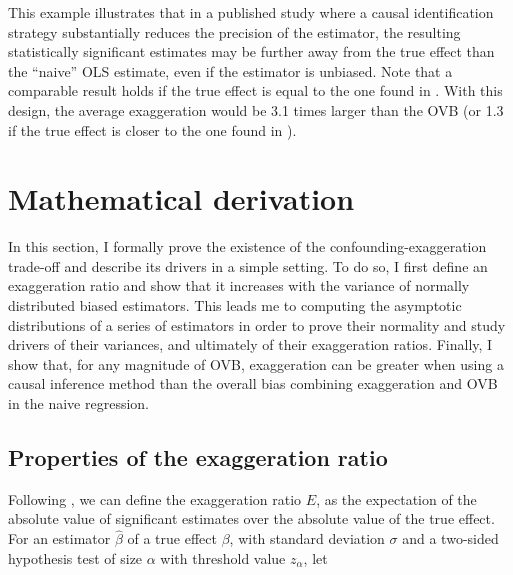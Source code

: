 \documentclass[usletter, 12pt]{article}
\begin{document}
		This example illustrates that in a published study where a causal identification strategy substantially reduces the precision of the estimator, the resulting statistically significant estimates may be further away from the true effect than the ``naive'' OLS estimate, even if the estimator is unbiased. Note that a comparable result holds if the true effect is equal to the one found in \cite{deryugina_mortality_2019}. With this design, the average exaggeration would be 3.1 times larger than the OVB (or 1.3 if the true effect is closer to the one found in \cite{deryugina_mortality_2019}).




	
	\section{Mathematical derivation} \label{maths}
						
		In this section, I formally prove the existence of the confounding-exaggeration trade-off  and describe its drivers in a simple setting.%
		To do so, I first define an exaggeration ratio  and show that it increases with the variance of normally distributed biased estimators. This leads me to computing the asymptotic distributions of a series of estimators in order to prove their normality and study drivers of their variances, and ultimately of their exaggeration ratios. Finally, I show that, for any magnitude of OVB, exaggeration can be greater when using a causal inference method than the overall bias combining exaggeration and OVB in the naive regression.
		
		
		\subsection{Properties of the exaggeration ratio}\label{general_exagg}
		
			Following  \cite{gelman_beyond_2014}, we can define the exaggeration ratio $E$, as the expectation of the absolute value of significant estimates over the absolute value of the true effect. For an estimator $\hat{\beta}$ of a true effect $\beta$, with standard deviation $\sigma$ and a two-sided hypothesis test of size $\alpha$ with threshold value $z_{\alpha}$, let
			
\end{document}
